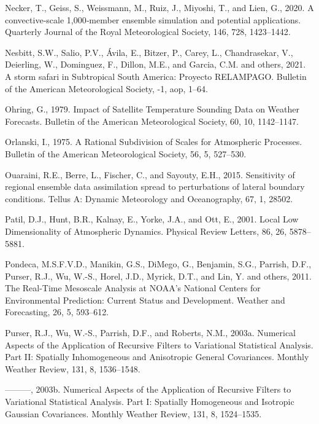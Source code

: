 \documentclass[12pt,oneside,a4paper]{reedthesis}
\begin{document}
\leavevmode\hypertarget{ref-necker2020}{}%
Necker, T., Geiss, S., Weissmann, M., Ruiz, J., Miyoshi, T., and Lien, G., 2020. A convective‐scale 1,000‐member ensemble simulation and potential applications. Quarterly Journal of the Royal Meteorological Society, 146, 728, 1423--1442.

\leavevmode\hypertarget{ref-nesbitt2021}{}%
Nesbitt, S.W., Salio, P.V., Ávila, E., Bitzer, P., Carey, L., Chandrasekar, V., Deierling, W., Dominguez, F., Dillon, M.E., and Garcia, C.M. and others, 2021. A storm safari in Subtropical South America: Proyecto RELAMPAGO. Bulletin of the American Meteorological Society, -1, aop, 1--64.

\leavevmode\hypertarget{ref-ohring1979}{}%
Ohring, G., 1979. Impact of Satellite Temperature Sounding Data on Weather Forecasts. Bulletin of the American Meteorological Society, 60, 10, 1142--1147.

\leavevmode\hypertarget{ref-orlanski1975}{}%
Orlanski, I., 1975. A Rational Subdivision of Scales for Atmospheric Processes. Bulletin of the American Meteorological Society, 56, 5, 527--530.

\leavevmode\hypertarget{ref-ouaraini2015}{}%
Ouaraini, R.E., Berre, L., Fischer, C., and Sayouty, E.H., 2015. Sensitivity of regional ensemble data assimilation spread to perturbations of lateral boundary conditions. Tellus A: Dynamic Meteorology and Oceanography, 67, 1, 28502.

\leavevmode\hypertarget{ref-patil2001}{}%
Patil, D.J., Hunt, B.R., Kalnay, E., Yorke, J.A., and Ott, E., 2001. Local Low Dimensionality of Atmospheric Dynamics. Physical Review Letters, 86, 26, 5878--5881.

\leavevmode\hypertarget{ref-pondeca2011}{}%
Pondeca, M.S.F.V.D., Manikin, G.S., DiMego, G., Benjamin, S.G., Parrish, D.F., Purser, R.J., Wu, W.-S., Horel, J.D., Myrick, D.T., and Lin, Y. and others, 2011. The Real-Time Mesoscale Analysis at NOAA's National Centers for Environmental Prediction: Current Status and Development. Weather and Forecasting, 26, 5, 593--612.

\leavevmode\hypertarget{ref-purser2003a}{}%
Purser, R.J., Wu, W.-S., Parrish, D.F., and Roberts, N.M., 2003a. Numerical Aspects of the Application of Recursive Filters to Variational Statistical Analysis. Part II: Spatially Inhomogeneous and Anisotropic General Covariances. Monthly Weather Review, 131, 8, 1536--1548.

\leavevmode\hypertarget{ref-purser2003}{}%
---------, 2003b. Numerical Aspects of the Application of Recursive Filters to Variational Statistical Analysis. Part I: Spatially Homogeneous and Isotropic Gaussian Covariances. Monthly Weather Review, 131, 8, 1524--1535.
\end{document}
